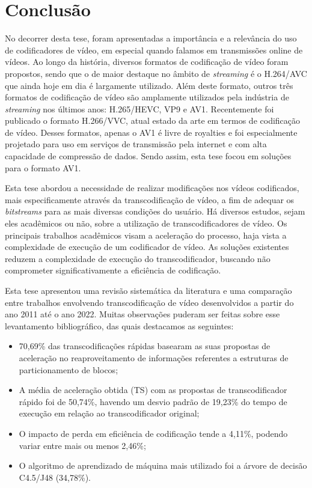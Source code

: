 \chapter{Conclusão}
\label{cap:conclusao}

No decorrer desta tese, foram apresentadas a importância e a relevância do uso de codificadores de vídeo, em especial quando falamos em transmissões online de vídeos. Ao longo da história, diversos formatos de codificação de vídeo foram propostos, sendo que o de maior destaque no âmbito de \textit{streaming} é o H.264/AVC que ainda hoje em dia é largamente utilizado. Além deste formato, outros três formatos de codificação de vídeo são amplamente utilizados pela indústria de \textit{streaming} nos últimos anos: H.265/HEVC, VP9 e AV1. Recentemente foi publicado o formato H.266/VVC, atual estado da arte em termos de codificação de vídeo. Desses formatos, apenas o AV1 é livre de royalties e foi especialmente projetado para uso em serviços de transmissão pela internet e com alta capacidade de compressão de dados. Sendo assim, esta tese focou em soluções para o formato AV1.

Esta tese abordou a necessidade de realizar modificações nos vídeos codificados, mais especificamente através da transcodificação de vídeo, a fim de adequar os \textit{bitstreams} para as mais diversas condições do usuário. Há diversos estudos, sejam eles acadêmicos ou não, sobre a utilização de transcodificadores de vídeo. Os principais trabalhos acadêmicos visam a aceleração do processo, haja vista a complexidade de execução de um codificador de vídeo. As soluções existentes reduzem a complexidade de execução do transcodificador, buscando não comprometer significativamente a eficiência de codificação.

Esta tese apresentou  uma revisão sistemática da literatura e uma comparação entre trabalhos envolvendo transcodificação de vídeo desenvolvidos a partir do ano 2011 até o ano 2022. Muitas observações puderam ser feitas sobre esse levantamento bibliográfico, das quais destacamos as seguintes:

\begin{itemize}
    \item 70,69\% das transcodificações rápidas basearam as suas propostas de aceleração no reaproveitamento de informações referentes a estruturas de particionamento de blocos;
    
    \item A média de aceleração obtida (TS) com as propostas de transcodificador rápido foi de 50,74\%, havendo um desvio padrão de 19,23\% do tempo de execução em relação ao transcodificador original;

    \item O impacto de perda em eficiência de codificação tende a  4,11\%, podendo variar entre mais ou menos 2,46\%;

    \item O algoritmo de aprendizado de máquina mais utilizado foi a árvore de decisão C4.5/J48 (34,78\%).
\end{itemize}

